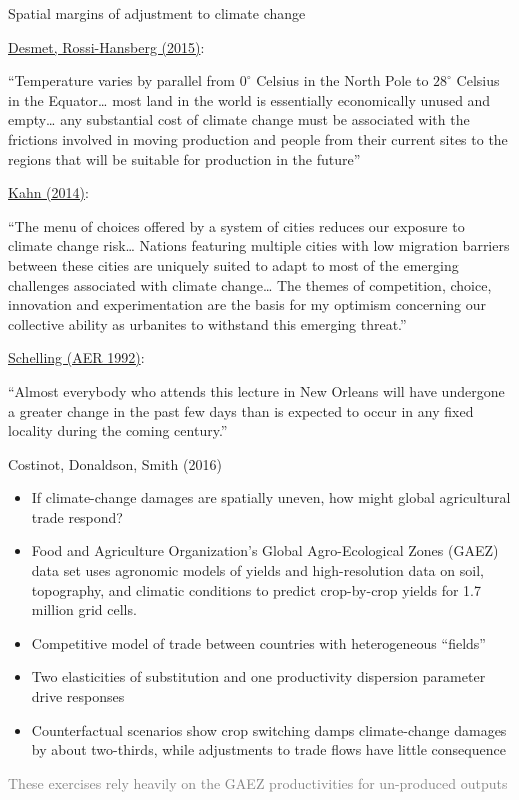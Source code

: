 \documentclass[11pt,notes=hide,aspectratio=169]{beamer}
\begin{document}
\begin{frame}{Spatial margins of adjustment to climate change}
{\footnotesize
\href{https://crossmark.crossref.org/dialog/?doi=10.1016/j.jue.2015.04.004}{Desmet, Rossi-Hansberg (2015)}:\\
{``Temperature varies by parallel from $0^{\circ}$ Celsius in the North Pole to $28^{\circ}$ Celsius in the Equator\dots
most land in the world is essentially economically unused and empty\dots
any substantial cost of climate change must be associated with the frictions involved in moving production and people from their current sites to the regions that will be suitable for production in the future''
\par}
\vspace{3mm}
\href{http://www.nber.org/papers/w20716}{Kahn (2014)}:\\
{``The menu of choices offered by a system of cities reduces our exposure to climate change risk\dots
Nations featuring multiple cities with low migration barriers between these cities are uniquely suited to adapt to most of the emerging challenges associated with climate change\dots
The themes of competition, choice, innovation and experimentation are the basis for my optimism concerning our collective ability as urbanites to withstand this emerging threat.''
\par}
\vspace{3mm}
\href{https://www.jstor.org/stable/2117599}{Schelling (AER 1992)}:\\
{``Almost everybody who attends this lecture in New Orleans will have undergone a greater change in the past few days than is expected to occur in any fixed locality during the coming century.''
\par}
}
\end{frame}
\begin{frame}{Costinot, Donaldson, Smith (2016)}
\begin{itemize}
\item
If climate-change damages are spatially uneven, how might global agricultural trade respond?
\item
Food and Agriculture Organization's Global Agro-Ecological Zones (GAEZ) data set uses agronomic models of yields and high-resolution data on soil, topography, and climatic conditions to predict crop-by-crop yields for 1.7 million grid cells.
\item
Competitive model of trade between countries with heterogeneous ``fields''
\item 
Two elasticities of substitution and one productivity dispersion parameter drive responses
\item
Counterfactual scenarios show crop switching damps climate-change damages by about two-thirds, while adjustments to trade flows have little consequence
\end{itemize}
\textcolor{gray}{These exercises rely heavily on the GAEZ productivities for un-produced outputs}
\end{frame}
\end{document}
